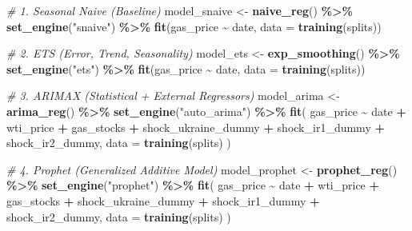 \documentclass[
]{article}
\newenvironment{Shaded}{\begin{snugshade}}{\end{snugshade}}
\newcommand{\AttributeTok}[1]{\textcolor[rgb]{0.13,0.29,0.53}{#1}}
\newcommand{\CommentTok}[1]{\textcolor[rgb]{0.56,0.35,0.01}{\textit{#1}}}
\newcommand{\FunctionTok}[1]{\textcolor[rgb]{0.13,0.29,0.53}{\textbf{#1}}}
\newcommand{\NormalTok}[1]{#1}
\newcommand{\OtherTok}[1]{\textcolor[rgb]{0.56,0.35,0.01}{#1}}
\newcommand{\SpecialCharTok}[1]{\textcolor[rgb]{0.81,0.36,0.00}{\textbf{#1}}}
\newcommand{\StringTok}[1]{\textcolor[rgb]{0.31,0.60,0.02}{#1}}
\begin{document}
\begin{Shaded}
\begin{Highlighting}[]
\CommentTok{\# 1. Seasonal Naive (Baseline)}
\NormalTok{model\_snaive }\OtherTok{\textless{}{-}} \FunctionTok{naive\_reg}\NormalTok{() }\SpecialCharTok{\%\textgreater{}\%}
  \FunctionTok{set\_engine}\NormalTok{(}\StringTok{"snaive"}\NormalTok{) }\SpecialCharTok{\%\textgreater{}\%}
  \FunctionTok{fit}\NormalTok{(gas\_price }\SpecialCharTok{\textasciitilde{}}\NormalTok{ date, }\AttributeTok{data =} \FunctionTok{training}\NormalTok{(splits))}

\CommentTok{\# 2. ETS (Error, Trend, Seasonality)}
\NormalTok{model\_ets }\OtherTok{\textless{}{-}} \FunctionTok{exp\_smoothing}\NormalTok{() }\SpecialCharTok{\%\textgreater{}\%}
  \FunctionTok{set\_engine}\NormalTok{(}\StringTok{"ets"}\NormalTok{) }\SpecialCharTok{\%\textgreater{}\%}
  \FunctionTok{fit}\NormalTok{(gas\_price }\SpecialCharTok{\textasciitilde{}}\NormalTok{ date, }\AttributeTok{data =} \FunctionTok{training}\NormalTok{(splits))}

\CommentTok{\# 3. ARIMAX (Statistical + External Regressors)}
\NormalTok{model\_arima }\OtherTok{\textless{}{-}} \FunctionTok{arima\_reg}\NormalTok{() }\SpecialCharTok{\%\textgreater{}\%}
  \FunctionTok{set\_engine}\NormalTok{(}\StringTok{"auto\_arima"}\NormalTok{) }\SpecialCharTok{\%\textgreater{}\%}
  \FunctionTok{fit}\NormalTok{(}
\NormalTok{    gas\_price }\SpecialCharTok{\textasciitilde{}}\NormalTok{ date }\SpecialCharTok{+}\NormalTok{ wti\_price }\SpecialCharTok{+}\NormalTok{ gas\_stocks }\SpecialCharTok{+}
\NormalTok{      shock\_ukraine\_dummy }\SpecialCharTok{+}\NormalTok{ shock\_ir1\_dummy }\SpecialCharTok{+}\NormalTok{ shock\_ir2\_dummy,}
    \AttributeTok{data =} \FunctionTok{training}\NormalTok{(splits)}
\NormalTok{  )}

\CommentTok{\# 4. Prophet (Generalized Additive Model)}
\NormalTok{model\_prophet }\OtherTok{\textless{}{-}} \FunctionTok{prophet\_reg}\NormalTok{() }\SpecialCharTok{\%\textgreater{}\%}
  \FunctionTok{set\_engine}\NormalTok{(}\StringTok{"prophet"}\NormalTok{) }\SpecialCharTok{\%\textgreater{}\%}
  \FunctionTok{fit}\NormalTok{(}
\NormalTok{    gas\_price }\SpecialCharTok{\textasciitilde{}}\NormalTok{ date }\SpecialCharTok{+}\NormalTok{ wti\_price }\SpecialCharTok{+}\NormalTok{ gas\_stocks }\SpecialCharTok{+}
\NormalTok{      shock\_ukraine\_dummy }\SpecialCharTok{+}\NormalTok{ shock\_ir1\_dummy }\SpecialCharTok{+}\NormalTok{ shock\_ir2\_dummy,}
    \AttributeTok{data =} \FunctionTok{training}\NormalTok{(splits)}
\NormalTok{  )}


\end{Highlighting}
\end{Shaded}
\end{document}
